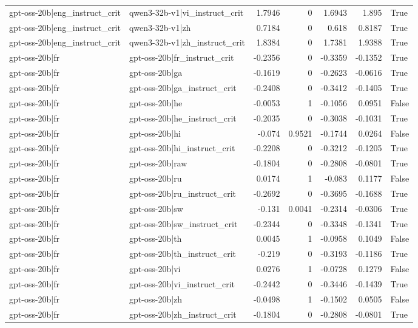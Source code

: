 \begin{table}
\begin{tabular}{l l r r r r l}
gpt-oss-20b|eng_instruct_crit & qwen3-32b-v1|vi_instruct_crit & 1.7946 & 0 & 1.6943 & 1.895 & True \\
gpt-oss-20b|eng_instruct_crit & qwen3-32b-v1|zh & 0.7184 & 0 & 0.618 & 0.8187 & True \\
gpt-oss-20b|eng_instruct_crit & qwen3-32b-v1|zh_instruct_crit & 1.8384 & 0 & 1.7381 & 1.9388 & True \\
gpt-oss-20b|fr & gpt-oss-20b|fr_instruct_crit & -0.2356 & 0 & -0.3359 & -0.1352 & True \\
gpt-oss-20b|fr & gpt-oss-20b|ga & -0.1619 & 0 & -0.2623 & -0.0616 & True \\
gpt-oss-20b|fr & gpt-oss-20b|ga_instruct_crit & -0.2408 & 0 & -0.3412 & -0.1405 & True \\
gpt-oss-20b|fr & gpt-oss-20b|he & -0.0053 & 1 & -0.1056 & 0.0951 & False \\
gpt-oss-20b|fr & gpt-oss-20b|he_instruct_crit & -0.2035 & 0 & -0.3038 & -0.1031 & True \\
gpt-oss-20b|fr & gpt-oss-20b|hi & -0.074 & 0.9521 & -0.1744 & 0.0264 & False \\
gpt-oss-20b|fr & gpt-oss-20b|hi_instruct_crit & -0.2208 & 0 & -0.3212 & -0.1205 & True \\
gpt-oss-20b|fr & gpt-oss-20b|raw & -0.1804 & 0 & -0.2808 & -0.0801 & True \\
gpt-oss-20b|fr & gpt-oss-20b|ru & 0.0174 & 1 & -0.083 & 0.1177 & False \\
gpt-oss-20b|fr & gpt-oss-20b|ru_instruct_crit & -0.2692 & 0 & -0.3695 & -0.1688 & True \\
gpt-oss-20b|fr & gpt-oss-20b|sw & -0.131 & 0.0041 & -0.2314 & -0.0306 & True \\
gpt-oss-20b|fr & gpt-oss-20b|sw_instruct_crit & -0.2344 & 0 & -0.3348 & -0.1341 & True \\
gpt-oss-20b|fr & gpt-oss-20b|th & 0.0045 & 1 & -0.0958 & 0.1049 & False \\
gpt-oss-20b|fr & gpt-oss-20b|th_instruct_crit & -0.219 & 0 & -0.3193 & -0.1186 & True \\
gpt-oss-20b|fr & gpt-oss-20b|vi & 0.0276 & 1 & -0.0728 & 0.1279 & False \\
gpt-oss-20b|fr & gpt-oss-20b|vi_instruct_crit & -0.2442 & 0 & -0.3446 & -0.1439 & True \\
gpt-oss-20b|fr & gpt-oss-20b|zh & -0.0498 & 1 & -0.1502 & 0.0505 & False \\
gpt-oss-20b|fr & gpt-oss-20b|zh_instruct_crit & -0.1804 & 0 & -0.2808 & -0.0801 & True \\

\end{tabular}
\end{table}
